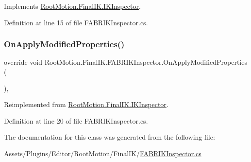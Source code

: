 Implements \mbox{\hyperlink{class_root_motion_1_1_final_i_k_1_1_i_k_inspector_a4c4528d5f5ce9af9e30c049138a5a5ca}{Root\+Motion.\+Final\+I\+K.\+I\+K\+Inspector}}.



Definition at line 15 of file F\+A\+B\+R\+I\+K\+Inspector.\+cs.

\mbox{\label{class_root_motion_1_1_final_i_k_1_1_f_a_b_r_i_k_inspector_a6a86f10a812820a3857c7d9a0c21a1b9}} 
\subsubsection{\texorpdfstring{On\+Apply\+Modified\+Properties()}{OnApplyModifiedProperties()}}
{\footnotesize\ttfamily override void Root\+Motion.\+Final\+I\+K.\+F\+A\+B\+R\+I\+K\+Inspector.\+On\+Apply\+Modified\+Properties (\begin{DoxyParamCaption}{ }\end{DoxyParamCaption})\hspace{0.3cm}{\ttfamily [protected]}, {\ttfamily [virtual]}}



Reimplemented from \mbox{\hyperlink{class_root_motion_1_1_final_i_k_1_1_i_k_inspector_a2909376aa17c40b7d7577761165d1c67}{Root\+Motion.\+Final\+I\+K.\+I\+K\+Inspector}}.



Definition at line 20 of file F\+A\+B\+R\+I\+K\+Inspector.\+cs.



The documentation for this class was generated from the following file\+:\begin{DoxyCompactItemize}
\item 
Assets/\+Plugins/\+Editor/\+Root\+Motion/\+Final\+I\+K/\mbox{\hyperlink{_f_a_b_r_i_k_inspector_8cs}{F\+A\+B\+R\+I\+K\+Inspector.\+cs}}\end{DoxyCompactItemize}

